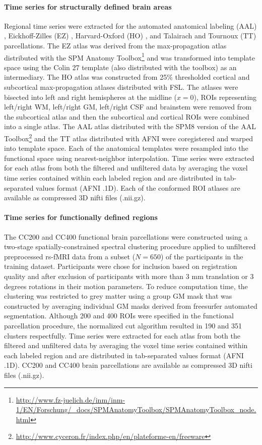 \documentclass[preprint,12pt,3p]{elsarticle}
\begin{document}
\begin{itemize}
\paragraph{Time series for structurally defined brain areas} Regional time series were extracted for the automated anatomical labeling (AAL) \cite{tzourio2002automated}, Eickhoff-Zilles (EZ) \cite{eickhoff2005new}, Harvard-Oxford (HO) \cite{HO_atlas_1, HO_atlas_2, HO_atlas_3, HO_atlas_4}, and Talairach and Tournoux (TT) \cite{lancaster2000automated} parcellations. The EZ atlas was derived from the max-propagation atlas distributed with the SPM Anatomy Toolbox\footnote{\url{http://www.fz-juelich.de/inm/inm-1/EN/Forschung/_docs/SPMAnatomyToolbox/SPMAnatomyToolbox_node.html}} and was transformed into template space using the Colin 27 template (also distributed with the toolbox) as an intermediary. The HO atlas was constructed from 25\% thresholded cortical and subcortical max-propagation atlases distributed with FSL. The atlases were bisected into left and right hemispheres at the midline ($x=0$), ROIs representing left/right WM, left/right GM, left/right CSF and brainstem were removed from the subcortical atlas and then the subcortical and cortical ROIs were combined into a single atlas. The AAL atlas distributed with the SPM8 version of the AAL Toolbox\footnote{\url{http://www.cyceron.fr/index.php/en/plateforme-en/freeware}} and the TT atlas distributed with AFNI were coregistered and warped into template space. Each of the anatomical templates were resampled into the functional space using nearest-neighbor interpolation. Time series were extracted for each atlas from both the filtered and unfiltered data by averaging the voxel time series contained within each labeled region and are distributed in tab-separated values format (AFNI .1D). Each of the conformed ROI atlases are available as compressed 3D nifti files (.nii.gz).

\paragraph{Time series for functionally defined regions} The CC200 and CC400 functional brain parcellations were constructed using a two-stage spatially-constrained spectral clustering procedure \cite{craddock2012whole} applied to unfiltered preprocessed rs-fMRI data from a subset ($N=650$) of the participants in the training dataset. Participants were chose for inclusion based on registration quality and after exclusion of participants with more than 3 mm translation or 3 degrees rotations in their motion parameters. To reduce computation time, the clustering was restricted to grey matter using a group GM mask that was constructed by averaging individual GM masks derived from freesurfer automated segmentation. Although 200 and 400 ROIs were specified in the functional parcellation procedure, the normalized cut algorithm resulted in 190 and 351 clusters respectfully. Time series were extracted for each atlas from both the filtered and unfiltered data by averaging the voxel time series contained within each labeled region and are distributed in tab-separated values format (AFNI .1D). CC200 and CC400 brain parcellations are available as compressed 3D nifti files (.nii.gz).


\end{itemize}
\end{document}
